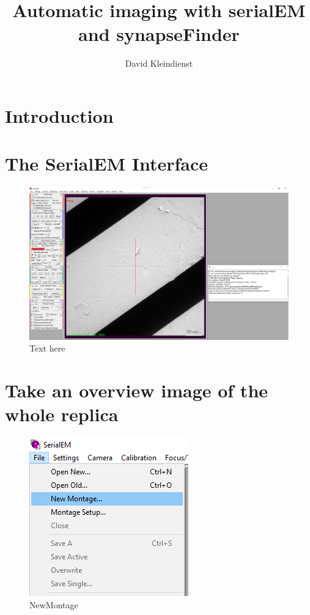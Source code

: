 \documentclass[12pt, a4paper]{scrartcl}
\author{David Kleindienst}
\title{Automatic imaging with serialEM and synapseFinder}
\begin{document}
\maketitle
\section{Introduction}

\section{The SerialEM Interface}
\begin{figure}[H]
\includegraphics[width=\linewidth]{screenshots/serEM.png}
\caption[SerialEM Interface]{Text here}
\end{figure}

\section{Take an overview image of the whole replica}

\begin{figure}[H]
\includegraphics[width=\linewidth]{screenshots/NewMontage.png}
\caption{NewMontage}
\end{figure}
\end{document}
